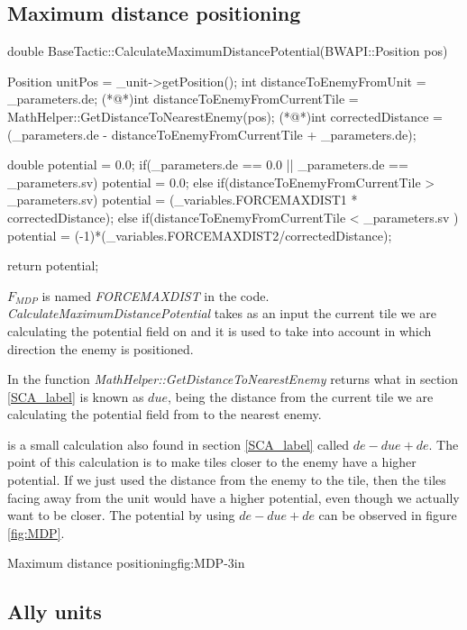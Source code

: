 {	\subsection{Maximum distance positioning}
		\begin{Sourcecode}[caption=Maximum distance]
double BaseTactic::CalculateMaximumDistancePotential(BWAPI::Position pos)
{
	Position unitPos = _unit->getPosition();
	int distanceToEnemyFromUnit = _parameters.de;
	(*@\lnote@*)int distanceToEnemyFromCurrentTile = MathHelper::GetDistanceToNearestEnemy(pos);
	(*@\lnote@*)int correctedDistance = (_parameters.de - distanceToEnemyFromCurrentTile + _parameters.de);

	double potential = 0.0;
	if(_parameters.de == 0.0 || _parameters.de == _parameters.sv)
		potential = 0.0;
	else if(distanceToEnemyFromCurrentTile > _parameters.sv)
		potential = (_variables.FORCEMAXDIST1 * correctedDistance);
	else if(distanceToEnemyFromCurrentTile < _parameters.sv )
		potential = (-1)*(_variables.FORCEMAXDIST2/correctedDistance);
	
	return potential;
}
\end{Sourcecode}
	$F_{MDP}$ is named \textit{FORCEMAXDIST} in the code.
	\textit{CalculateMaximumDistancePotential} takes as an input the current tile we are calculating the potential field on and it is used to take into account in which direction the enemy is positioned.
	
	In  the function \textit{MathHelper::GetDistanceToNearestEnemy} returns what in section \ref{SCA_label} is known as $due$, being the distance from the current tile we are calculating the potential field from to the nearest enemy.
	
	 is a small calculation also found in section \ref{SCA_label} called $de - due + de$. The point of this calculation is to make tiles closer to the enemy have a higher potential. If we just used the distance from the enemy to the tile, then the tiles facing away from the unit would have a higher potential, even though we actually want to be closer. The potential by using $de - due + de$ can be observed in figure \ref{fig:MDP}.
	
			{Maximum distance positioning}{fig:MDP}{-3in}
		
	\subsection{Ally units}
	
}
